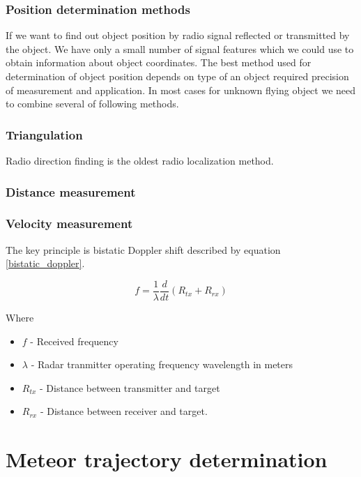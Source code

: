 \documentclass[twoside]{ctuthesis}
\theoremstyle{plain}
\theoremstyle{definition}
\theoremstyle{note}
\begin{document}
\subsection{Position determination methods}

If we want to find out object position by radio signal reflected or transmitted by the object. We have only a small number of signal features which we could use to obtain information about object coordinates. The best method used for determination of object position depends on type of an object required precision of measurement and application. In most cases for unknown flying object we need to combine several of following methods. 

\subsection{Triangulation}

Radio direction finding is the oldest radio localization method. 

\subsection{Distance measurement}


\subsection{Velocity measurement}


The key principle is bistatic Doppler shift described by equation \ref{bistatic_doppler}. 

\begin{equation}
f = \frac{1}{\lambda} \frac{d}{dt} \left( R_{tx} + R_{rx} \right)
\label{bistatic_doppler}
\end{equation}

Where 
\begin{itemize}
\item $f$ - Received frequency
\item $\lambda$ - Radar tranmitter operating frequency wavelength in meters
\item $R_{tx}$ - Distance between transmitter and target
\item $R_{rx}$ - Distance between receiver and target.
\end{itemize}

\chapter{Meteor trajectory determination}
\end{document}
